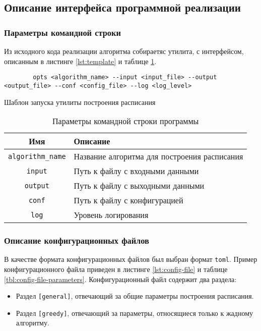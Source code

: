\subsection{Описание интерфейса программной реализации}
\subsubsection{Параметры командной строки}
Из исходного кода реализации алгоритма собираетяс утилита, с интерфейсом, описанным в листинге \ref{lst:template} и таблице \ref{tbl:command-line-parameters}. 
\begin{listing}[!htbp]
    \begin{verbatim}
        opts <algorithm_name> --input <input_file> --output <output_file> --conf <config_file> --log <log_level>
    \end{verbatim}
    \caption{Шаблон запуска утилиты построения расписания}
    \label{lst:template}
\end{listing}

\begin{table}[!htbp]
    \centering
    \begin{tabularx}{\textwidth}{|c|X|}
        \hline
        Имя                      & Описание                                     \\
        \hline
        \texttt{algorithm\_name} & Название алгоритма для построения расписания \\
        \hline
        \texttt{input}           & Путь к файлу с входными данными              \\
        \hline
        \texttt{output}          & Путь к файлу с выходными данными             \\
        \hline
        \texttt{conf}            & Путь к файлу с конфигурацией                 \\
        \hline
        \texttt{log}             & Уровень логирования                          \\
        \hline
    \end{tabularx}
    \caption{Параметры командной строки программы}
    \label{tbl:command-line-parameters}
\end{table}
\subsubsection{Описание конфигурационных файлов}
В качестве формата конфигурационных файлов был выбран формат \texttt{toml}. Пример конфигурационного файла приведен в листинге \ref{lst:config-file} и таблице \ref{tbl:config-file-parameters}. Конфигурационный файл содержит два раздела:
\begin{itemize}
    \item Раздел \texttt{[general]}, отвечающий за общие параметры построения расписания.
    \item Раздел \texttt{[greedy]}, отвечающий за параметры, относящиеся только к жадному алгоритму.
\end{itemize}

